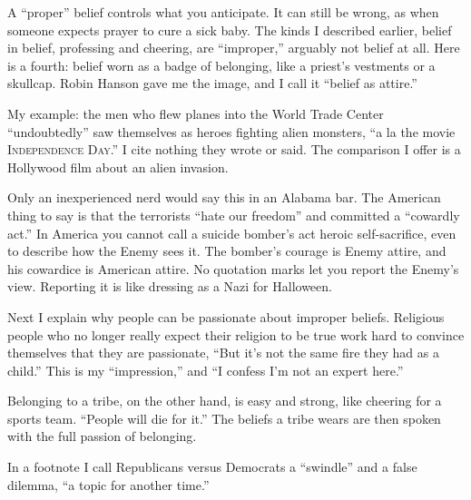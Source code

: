 
A ``proper'' belief controls what you anticipate. It can still be wrong, as when someone expects prayer to cure a sick baby. The kinds I described earlier, belief in belief, professing and cheering, are ``improper,'' arguably not belief at all. Here is a fourth: belief worn as a badge of belonging, like a priest's vestments or a skullcap. Robin Hanson gave me the image, and I call it ``belief as attire.'' 

My example: the men who flew planes into the World Trade Center ``undoubtedly'' saw themselves as heroes fighting alien monsters, ``a la the movie \textsc{Independence Day}.'' I cite nothing they wrote or said. The comparison I offer is a Hollywood film about an alien invasion.

Only an inexperienced nerd would say this in an Alabama bar. The American thing to say is that the terrorists ``hate our freedom'' and committed a ``cowardly act.''  In America you cannot call a suicide bomber's act heroic self-sacrifice, even to describe how the Enemy sees it. The bomber's courage is Enemy attire, and his cowardice is American attire. No quotation marks let you report the Enemy's view. Reporting it is like dressing as a Nazi for Halloween. 

Next I explain why people can be passionate about improper beliefs. Religious people who no longer really expect their religion to be true work hard to convince themselves that they are passionate, ``But it's not the same fire they had as a child.'' This is my ``impression,'' and ``I confess I'm not an expert here.'' 

Belonging to a tribe, on the other hand, is easy and strong, like cheering for a sports team. ``People will die for it.'' The beliefs a tribe wears are then spoken with the full passion of belonging.

In a footnote I call Republicans versus Democrats a ``swindle'' and a false dilemma, ``a topic for another time.''

